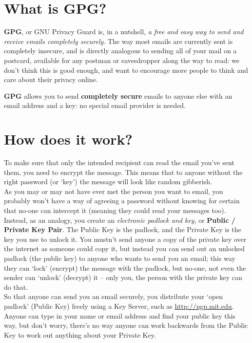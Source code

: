 
\section{What is GPG?}

\textbf{GPG}, or GNU Privacy Guard is, in a nutshell, \textit{a free and easy way to send and receive emails completely securely}. The way most emails are currently sent is completely insecure, and is directly analogous to sending all of your mail on a postcard, available for any postman or eavesdropper along the way to read: we don't think this is good enough, and want to encourage more people to think and care about their privacy online.

\textbf{GPG} allows you to send \textbf{completely secure} emails to anyone else with an email address and a key: no special email provider is needed.

\section{How does it work?}
To make sure that only the intended recipient can read the email you've sent them, you need to encrypt the message. This means that to anyone without the right password (or `key') the message will look like random gibberish. \\As you may or may not have ever met the person you want to email, you probably won't have a way of agreeing a password without knowing for certain that no-one can intercept it (meaning they could read your messages too). Instead, as an analogy, you create an \textit{electronic padlock and key}, or \textbf{Public / Private Key Pair}. The Public Key is the padlock, and the Private Key is the key you use to unlock it. You mustn't send anyone a copy of the private key over the internet as someone could copy it, but instead you can send out an unlocked padlock (the public key) to anyone who wants to send you an email; this way they can `lock' (encrypt) the message with the padlock, but no-one, not even the sender can `unlock' (decrypt) it -- only you, the person with the private key can do that.\\ So that anyone can send you an email securely, you distribute your `open padlock' (Public Key) freely using a Key Server, such as \href{http://pgp.mit.edu}{http://pgp.mit.edu}. Anyone can type in your name or email address and find your public key this way, but don't worry, there's no way anyone can work backwards from the Public Key to work out anything about your Private Key.

